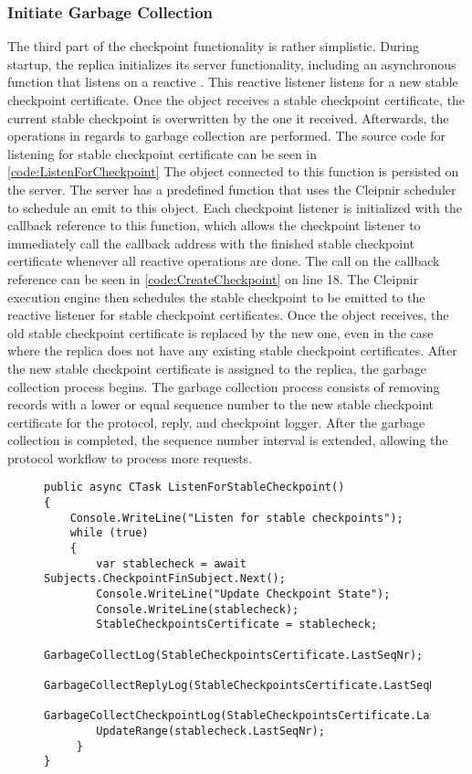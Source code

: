 \subsubsection{Initiate Garbage Collection}
The third part of the checkpoint functionality is rather simplistic. During startup, the replica initializes its server functionality, including an asynchronous function that listens on a reactive . This reactive listener listens for a new stable checkpoint certificate. Once the  object receives a stable checkpoint certificate, the current stable checkpoint is overwritten by the one it received. Afterwards, the operations in regards to garbage collection are performed. The source code for listening for stable checkpoint certificate can be seen in \autoref{code:ListenForCheckpoint}
The  object connected to this function is persisted on the server. The server has a predefined function that uses the Cleipnir scheduler to schedule an emit to this  object. Each checkpoint listener is initialized with the callback reference to this function, which allows the checkpoint listener to immediately call the callback address with the finished stable checkpoint certificate whenever all reactive operations are done. The call on the callback reference can be seen in \autoref{code:CreateCheckpoint} on line 18. The Cleipnir execution engine then schedules the stable checkpoint to be emitted to the reactive listener for stable checkpoint certificates. Once the  object receives, the old stable checkpoint certificate is replaced by the new one, even in the case where the replica does not have any existing stable checkpoint certificates. After the new stable checkpoint certificate is assigned to the replica, the garbage collection process begins. The garbage collection process consists of removing records with a lower or equal sequence number to the new stable checkpoint certificate for the protocol, reply, and checkpoint logger.
After the garbage collection is completed, the sequence number interval is extended, allowing the protocol workflow to process more requests.

\begin{figure}[H]
	\centering
	\begin{lstlisting}[label = code:ListenForCheckpoint, caption=Reactive handler for new stable checkpoints, captionpos = b, basicstyle=\scriptsize]
public async CTask ListenForStableCheckpoint()
{
    Console.WriteLine("Listen for stable checkpoints");
    while (true)
    {
    	var stablecheck = await Subjects.CheckpointFinSubject.Next();
        Console.WriteLine("Update Checkpoint State");
        Console.WriteLine(stablecheck);
        StableCheckpointsCertificate = stablecheck;
        GarbageCollectLog(StableCheckpointsCertificate.LastSeqNr);
        GarbageCollectReplyLog(StableCheckpointsCertificate.LastSeqNr);
        GarbageCollectCheckpointLog(StableCheckpointsCertificate.LastSeqNr);
        UpdateRange(stablecheck.LastSeqNr);
     }
}
    \end{lstlisting}
\end{figure}

